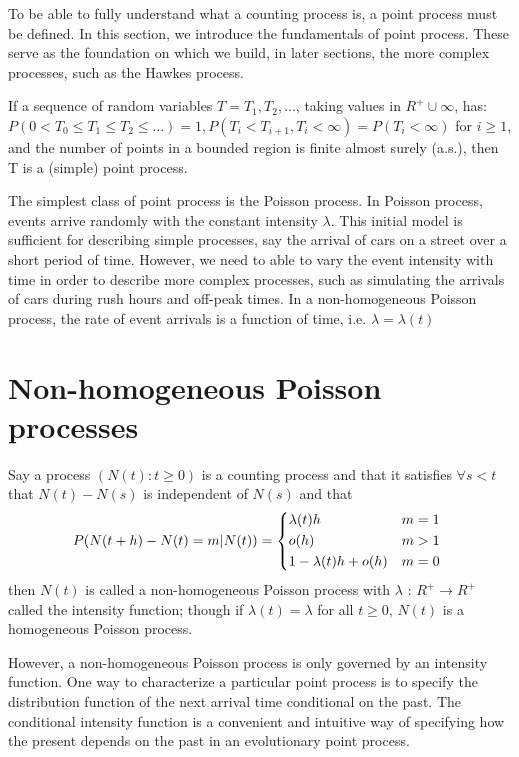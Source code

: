 To be able to fully understand what a counting process is, a point process must be defined. In this section, we introduce the fundamentals of point process. These serve as the foundation on which we build, in later sections, the more complex processes, such as the Hawkes process.

\begin{Definition}{}	
If a sequence of random variables $T = {T_{1}, T_{2}, . . . }$, taking values in $R^{+} \cup {\infty}$, has: $P(0 < T_{0} \leq T_{1} \leq T_{2} \leq . . . ) = 1, P(T_{i} < T_{i+1}, T_{i} < \infty) = P(T_{i} < \infty) $ for $i \geq 1 $, and the number of points in a bounded region is finite almost surely (a.s.), then T is a (simple) point process.
\label{Def Point process}
\end{Definition}

The simplest class of point process is the Poisson process. In Poisson process, events arrive randomly with the constant intensity $\lambda$. This initial model is sufficient for describing simple processes, say the arrival of cars on a street over a short period of time. However, we need to able to vary the event intensity with time in order to describe more complex processes, such as simulating the arrivals of cars during rush hours and off-peak times. In a non-homogeneous Poisson process, the rate of event arrivals is a function of time, i.e. $\lambda = \lambda(t)$

\section{Non-homogeneous Poisson processes}
\begin{Definition}{}	
Say a process $(N(t): t\geq 0)$ is a counting process and that it satisfies $ \forall s <t $ that $N(t)-N(s)$ is independent of $N(s)$ and that		
	\begin{align*}
	P(N(t + h) - N(t) = m \rvert N(t)) = 
	\begin{cases*}
	\lambda(t)h & $m = 1$ \\
	o(h) & $m > 1$  \\
	1-\lambda(t)h + o(h) & $ m = 0$  
	\end{cases*}  
	\end{align*}
then $N(t)$ is called a non-homogeneous Poisson process with $\lambda$ : $ R^{+} \rightarrow R^{+} $ called the intensity function; though if $\lambda(t) = \lambda $ for all $t \geq 0$, $N(t)$ is a homogeneous Poisson process.
\end{Definition}
However, a non-homogeneous Poisson process is only governed by an intensity function. One way to characterize a particular point process is to specify the distribution function of the next arrival time conditional on the past. The conditional intensity function is a convenient and intuitive way of specifying how the present depends on the past in an evolutionary point process.
